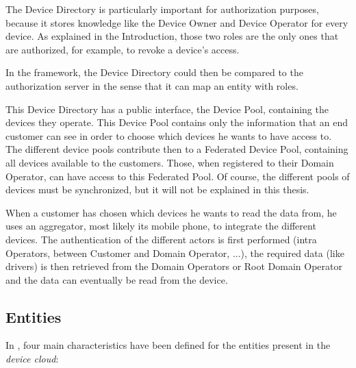 The Device Directory is particularly important for authorization purposes, because it stores knowledge like the Device Owner and Device Operator for every device. As explained in the Introduction, those two roles are the only ones that are authorized, for example, to revoke a device's access. 

In the framework, the Device Directory could then be compared to the authorization server in the sense that it can map an entity with roles.

This Device Directory has a public interface, the Device Pool, containing the devices they operate. This Device Pool contains only the information that an end customer can see in order to choose which devices he wants to have access to. The different device pools contribute then to a Federated Device Pool, containing all devices available to the customers. Those, when registered to their Domain Operator, can have access to this Federated Pool. Of course, the different pools of devices must be synchronized, but it will not be explained in this thesis.

When a customer has chosen which devices he wants to read the data from, he uses an aggregator, most likely its mobile phone, to integrate the different devices. The authentication of the different actors is first performed (intra Operators, between Customer and Domain Operator, ...), the required data (like drivers) is then retrieved from the Domain Operators or Root Domain Operator and the data can eventually be read from the device.

 \subsection{Entities}
 In , four main characteristics have been defined for the entities present in the \emph{device cloud}:
 
